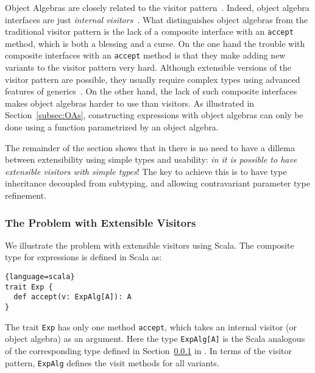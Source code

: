 Object Algebras are closely related to the visitor
pattern~\cite{gamma1994design}.  Indeed, object algebra interfaces are just
\emph{internal
  visitors}~\cite{oliveira09modular,oliveira2012extensibility}. 
What distinguishes object algebras
from the traditional visitor pattern is the lack of a composite
interface with an \lstinline{accept} method, which 
is both a blessing and a curse.  On
the one hand the trouble with composite interfaces with an
\lstinline{accept} method is that they make adding new variants to the
visitor pattern very hard. Although extensible versions of the visitor
pattern are possible, they usually require complex types using
advanced features of generics~\cite{togersen:2004,oliveira2012extensibility}. On the other hand, the lack of
such composite interfaces makes object algebras harder to use than
visitors. As illustrated in Section~\ref{subsec:OAs}, constructing expressions
with object algebras can only be done using a function parametrized by
an object algebra.

The remainder of the section shows that in \name there is no need to
have a dillema between extensibility using simple types and
usability: \emph{in \name it is possible to have extensible visitors with
simple types}! The key to achieve this is to have type inheritance
decoupled from subtyping, and allowing contravariant parameter type 
refinement. 

\subsubsection{The Problem with Extensible Visitors}
\begin{comment}
is another design pattern that
facilitates extensibility. The gist of this pattern is to decouple an object
hierarchy from the behaviors of each object. In other words, objects no longer
contain operations but instead ``accept'' visitors to perform operations on
them. The visitor pattern tackles at the very problem that makes programming in
traditional OO styles hard to add a new operation, since operations are defined
inside object classes that represent data structures. As a result, using the
visitor pattern allows adding new operations to existing structures without
modifying code of structures, a style enjoyed by functional
programming. 
\end{comment}
We illustrate the problem with extensible visitors using Scala.
The composite type for expressions is defined in Scala as:
\begin{lstlisting}{language=scala}
trait Exp {
  def accept(v: ExpAlg[A]): A
}
\end{lstlisting}
The trait \lstinline{Exp} has only one method 
\lstinline$accept$, which takes an internal visitor (or object
algebra) as an argument. 
Here the type \lstinline{ExpAlg[A]} is the Scala analogous of the
corresponding type defined in Section~\ref{} in \name. In terms 
of the visitor pattern, \lstinline{ExpAlg} defines the visit methods 
for all variants. 

